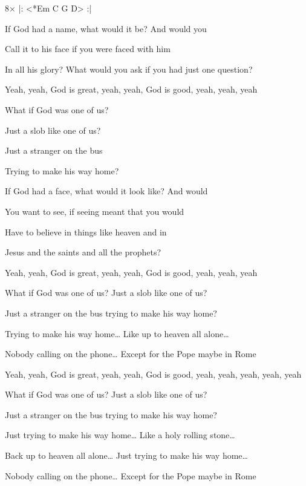 

8× |: <*Em C G D> :|

\zs
If God had a name, what would it be? And would you

Call it to his face if you were faced with him

In all his glory? What would you ask if you had just one question?

Yeah, yeah, God is great, yeah, yeah, God is good, yeah, yeah, yeah
\ks

\zr
What if God was one of us?

Just a slob like one of us?

Just a stranger on the bus

Trying to make his way home?
\kr

\zs
If God had a face, what would it look like? And would

You want to see, if seeing meant that you would

Have to believe in things like heaven and in 

Jesus and the saints and all the prophets?

Yeah, yeah, God is great, yeah, yeah, God is good, yeah, yeah, yeah
\ks

\zr
What if God was one of us?  Just a slob like one of us?

Just a stranger on the bus trying to make his way home?

Trying to make his way home…  Like up to heaven all alone…

Nobody calling on the phone…  Except for the Pope maybe in Rome

Yeah, yeah, God is great, yeah, yeah, God is good, yeah, yeah, yeah, yeah, yeah
\kr

\zr
What if God was one of us?  Just a slob like one of us?

Just a stranger on the bus trying to make his way home?

Just trying to make his way home…
Like a holy rolling stone…

Back up to heaven all alone…
Just trying to make his way home…

Nobody calling on the phone…
Except for the Pope maybe in Rome
\kr

\kp
